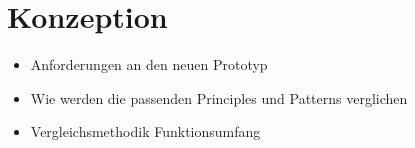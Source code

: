 \section{Konzeption}
\begin{itemize}
    \item Anforderungen an den neuen Prototyp
    \item Wie werden die passenden Principles und Patterns verglichen
    \item Vergleichsmethodik Funktionsumfang
\end{itemize}
